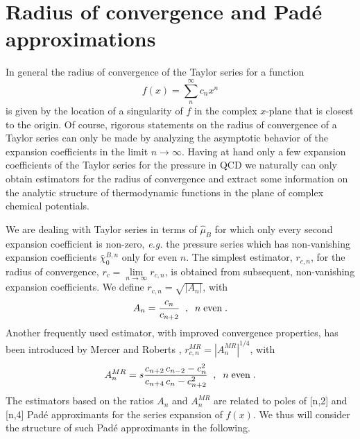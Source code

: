 \documentclass[pdflatex,prd,twocolumn,showpacs,superscriptaddress,nofootinbib]{revtex4-1}
\newcommand \hmu {\hat{\mu}}
\newcommand \cb {\bar{\chi}}
\begin{document}
\section{Radius of convergence and Pad\'e approximations}
\label{radius}

In general the radius of convergence of the Taylor series for a function
\begin{equation}
f(x)= \sum_n^{\infty} c_n x^n
\label{series}
\end{equation}
is given by the location of a singularity of $f$ in the complex 
$x$-plane that is closest to the origin. Of course, 
rigorous statements on the radius of convergence 
of a Taylor series can only be made by analyzing the asymptotic behavior of the expansion coefficients in the limit $n\rightarrow \infty$. 
Having at hand only a few expansion coefficients of the Taylor series for the pressure in QCD we naturally can only obtain estimators for the radius of convergence and extract some information on the analytic structure of thermodynamic functions in the plane of complex chemical potentials.

We are dealing with Taylor series in terms of $\hmu_B$ for which only every
second expansion coefficient is non-zero,
{\it e.g.} the pressure series which has 
non-vanishing expansion coefficients $\cb_0^{B,n}$ only for even $n$.
The simplest estimator, $r_{c,n}$, for the radius of convergence, 
$r_c=\lim\limits_{n\rightarrow \infty} r_{c,n}$, is obtained from subsequent, 
non-vanishing expansion coefficients. We define $r_{c,n}=\sqrt{|A_n|}$, with
\begin{equation}
 A_n= \frac{c_{n}}{c_{n+2}} \;\; , \;\; n\;{\rm even} \; .
\end{equation}
Another frequently used estimator, with improved convergence 
properties, has been introduced by Mercer and Roberts \cite{Mercer:1990}, $r_{c,n}^{MR} = |A_n^{MR}|^{1/4}$, with
\begin{equation}
A_n^{MR}= s\frac{c_{n+2} \, c_{n-2} - c_n^2 } { c_{n+4} \, c_n - c_{n+2}^2 } \;\; , \;\; n\; {\rm even} \; .
\label{rcMR}
\end{equation}
The estimators based 
on the ratios $A_n$ and $A_n^{MR}$ are
related to poles of [n,2] and [n,4]
Pad\'e approximants for the series
expansion of $f(x)$. We thus will consider the structure of such Pad\'e approximants in the following.
\end{document}
